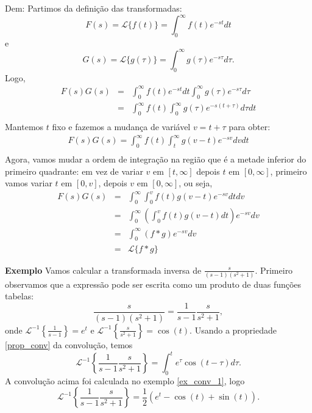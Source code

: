 \documentclass[a4paper,10pt]{book}
\begin{document}
 
Dem:
Partimos da definição das transformadas:
\begin{equation}
F(s)=\mathcal{L}\{f(t) \}=\int_0^\infty f(t)e^{-st}dt
\end{equation}
e
\begin{equation}
G(s)=\mathcal{L}\{g(\tau) \}=\int_0^\infty g(\tau)e^{-s\tau}d\tau.
\end{equation}
Logo,
\begin{eqnarray*}
 F(s)G(s)&=&\int_0^\infty f(t)e^{-st}dt\int_0^\infty g(\tau)e^{-s\tau}d\tau\\
&=&\int_0^\infty f(t) \int_0^\infty g(\tau)e^{-s(t+\tau)} d\tau dt\\
\end{eqnarray*}
Mantemos $t$ fixo e fazemos a mudança de variável $v=t+\tau$ para obter:
\begin{eqnarray*}
 F(s)G(s)=\int_0^\infty f(t) \int_t^\infty g(v-t)e^{-sv}dv dt\\
\end{eqnarray*}
Agora, vamos mudar a ordem de integração na região que é a metade inferior do primeiro quadrante: em vez de variar $v$ em $[t,\infty]$ depois $t$ em $[0,\infty]$, primeiro vamos variar $t$ em $[0,v]$, depois $v$ em $[0,\infty]$, ou seja,
\begin{eqnarray*}
 F(s)G(s)&=&\int_0^\infty  \int_0^v f(t) g(v-t)e^{-sv} dt dv\\
 &=&\int_0^\infty \left( \int_0^v f(t) g(v-t)dt\right)e^{-sv}  dv\\
 &=&\int_0^\infty (f*g)e^{-sv}  dv\\
   &=&\mathcal{L}\{f*g\}
\end{eqnarray*}


{\bf Exemplo} Vamos calcular a transformada inversa de $\frac{s}{(s-1)(s^2+1)}$. Primeiro observamos que a expressão pode ser escrita como um produto de duas funções tabelas:
\begin{equation}
\frac{s}{(s-1)(s^2+1)}=\frac{1}{s-1}\frac{s}{s^2+1},
\end{equation}
 onde $\mathcal{L}^{-1}\left\{\frac{1}{s-1}\right\}=e^t$ e $\mathcal{L}^{-1}\left\{\frac{s}{s^2+1}\right\}=\cos(t)$. Usando a propriedade \ref{prop_conv} da convolução, temos
 \begin{equation}
 \mathcal{L}^{-1}\left\{\frac{1}{s-1}\frac{s}{s^2+1}\right\}=\int_0^t e^\tau \cos(t-\tau)d\tau.
 \end{equation}
 A convolução acima foi calculada no exemplo \ref{ex_conv_1}, logo
\begin{equation}
 \mathcal{L}^{-1}\left\{\frac{1}{s-1}\frac{s}{s^2+1}\right\}= \frac{1}{2}\left(e^t-\cos(t)+\sin(t)  \right).
 \end{equation}
 
\end{document}
